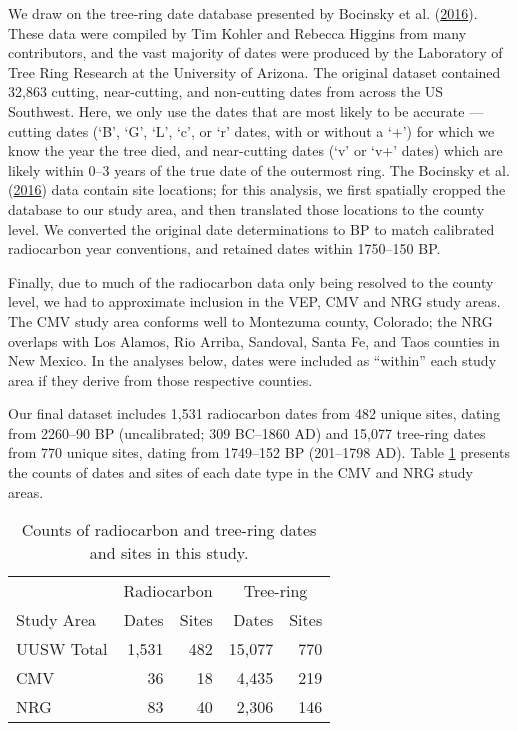 \documentclass[
]{sa}
\begin{document}
We draw on the tree-ring date database presented by Bocinsky et al. (\protect\hyperlink{ref-Bocinsky2016}{2016}). These data were compiled by Tim Kohler and Rebecca Higgins from many contributors, and the vast majority of dates were produced by the Laboratory of Tree Ring Research at the University of Arizona. The original dataset contained 32,863 cutting, near-cutting, and non-cutting dates from across the US Southwest. Here, we only use the dates that are most likely to be accurate --- cutting dates (`B', `G', `L', `c', or `r' dates, with or without a `+') for which we know the year the tree died, and near-cutting dates (`v' or `v+' dates) which are likely within 0--3 years of the true date of the outermost ring. The Bocinsky et al. (\protect\hyperlink{ref-Bocinsky2016}{2016}) data contain site locations; for this analysis, we first spatially cropped the database to our study area, and then translated those locations to the county level. We converted the original date determinations to BP to match calibrated radiocarbon year conventions, and retained dates within 1750--150 BP.

Finally, due to much of the radiocarbon data only being resolved to the county level, we had to approximate inclusion in the VEP, CMV and NRG study areas. The CMV study area conforms well to Montezuma county, Colorado; the NRG overlaps with Los Alamos, Rio Arriba, Sandoval, Santa Fe, and Taos counties in New Mexico. In the analyses below, dates were included as ``within'' each study area if they derive from those respective counties.

Our final dataset includes 1,531 radiocarbon dates from 482 unique sites, dating from 2260--90 BP (uncalibrated; 309 BC--1860 AD) and 15,077 tree-ring dates from 770 unique sites, dating from 1749--152 BP (201--1798 AD). Table \ref{tab:Table1} presents the counts of dates and sites of each date type in the CMV and NRG study areas.

\begin{table}

\caption{\label{tab:Table1}Counts of radiocarbon and tree-ring dates and sites in this study.}
\centering
\begin{tabular}[t]{lrrrr}
\toprule
\multicolumn{1}{c}{ } & \multicolumn{2}{c}{Radiocarbon} & \multicolumn{2}{c}{Tree-ring} \\
\cmidrule(l{3pt}r{3pt}){2-3} \cmidrule(l{3pt}r{3pt}){4-5}
Study Area & Dates & Sites & Dates & Sites\\
\midrule
UUSW Total & 1,531 & 482 & 15,077 & 770\\
CMV & 36 & 18 & 4,435 & 219\\
NRG & 83 & 40 & 2,306 & 146\\
\bottomrule
\end{tabular}
\end{table}
\end{document}
